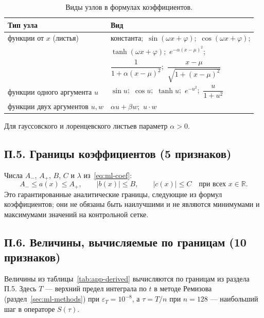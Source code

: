 \documentclass[14pt,a4paper]{extarticle}
\begin{document}
\begin{table}[!htbp]
\centering
\caption{Виды узлов в формулах коэффициентов.}
\label{tab:app-ops}
\renewcommand{\arraystretch}{1.3}
\begin{tabular}{>{\raggedright\arraybackslash}p{}l}
\toprule
Тип узла & Вид\\
\midrule
функции от $x$ (листья) & константа;\ $\sin(\omega x+\varphi)$;\ $\cos(\omega x+\varphi)$;\\
 & $\tanh(\omega x+\varphi)$;\ $e^{-\alpha(x-\mu)^2}$;\\
 & $\dfrac{1}{1+\alpha(x-\mu)^2}$;\ $\dfrac{x-\mu}{\sqrt{1+(x-\mu)^2}}$\\
\midrule
функции одного аргумента $u$ & $\sin u$;\ $\cos u$;\ $\tanh u$;\ $e^{-u^2}$;\ $\dfrac{u}{1+u^2}$\\
\midrule
функции двух аргументов $u,w$ & $\alpha u+\beta w$;\ $u\cdot w$\\
\bottomrule
\end{tabular}
\end{table}

Для гауссовского и лоренцевского листьев параметр $\alpha>0$.

\subsection*{П.5. Границы коэффициентов (5 признаков)}
Числа $A_-$, $A_+$, $B$, $C$ и $\lambda$ из~\eqref{eq:ml-coef}:
\[
A_-\le a(x)\le A_+,\qquad |b(x)|\le B,\qquad |c(x)|\le C
\quad\text{при всех } x\in\mathbb R.
\]
Это гарантированные аналитические границы, следующие из формул
коэффициентов; они не обязаны быть наилучшими и не являются
минимумами и максимумами значений на контрольной сетке.

\subsection*{П.6. Величины, вычисляемые по границам (10 признаков)}
Величины из таблицы~\ref{tab:app-derived} вычисляются по границам
из раздела П.5. Здесь $T$ --- верхний предел интеграла по $t$ в методе
Ремизова (раздел~\ref{sec:ml-methods}) при $\varepsilon_T=10^{-8}$,
а $\tau=T/n$ при $n=128$ --- наибольший шаг в операторе $S(\tau)$.
\end{document}
